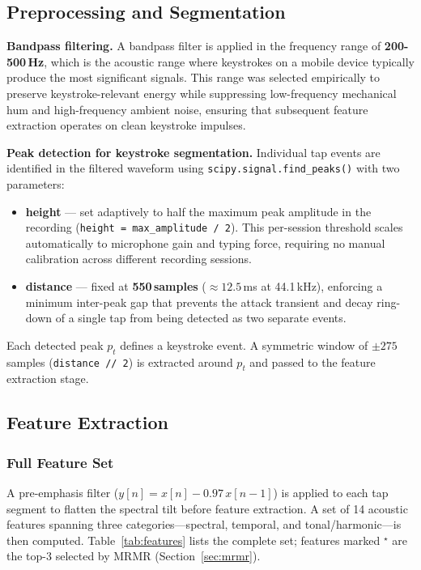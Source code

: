 \documentclass[conference]{IEEEtran}
\begin{document}
\subsection{Preprocessing and Segmentation}

\textbf{Bandpass filtering.}
A bandpass filter is applied in the frequency range of
\textbf{200-500\,Hz}, which is the acoustic range where
keystrokes on a mobile device typically produce the most
significant signals.
This range was selected empirically to preserve keystroke-relevant
energy while suppressing low-frequency mechanical hum and
high-frequency ambient noise, ensuring that subsequent feature
extraction operates on clean keystroke impulses.

\textbf{Peak detection for keystroke segmentation.}
Individual tap events are identified in the filtered waveform using
\texttt{scipy.signal.find\_peaks()} with two parameters:
\begin{itemize}
  \item \textbf{height} — set adaptively to half the maximum peak
        amplitude in the recording
        (\texttt{height\,=\,max\_amplitude\,/\,2}).
        This per-session threshold scales automatically to
        microphone gain and typing force, requiring no manual
        calibration across different recording sessions.
  \item \textbf{distance} — fixed at \textbf{550\,samples}
        (${\approx}12.5$\,ms at 44.1\,kHz), enforcing a minimum
        inter-peak gap that prevents the attack transient and
        decay ring-down of a single tap from being detected as
        two separate events.
\end{itemize}
Each detected peak $p_t$ defines a keystroke event.
A symmetric window of $\pm 275$\,samples (\texttt{distance\,//\,2})
is extracted around $p_t$ and passed to the feature extraction
stage.

\subsection{Feature Extraction}

\subsubsection{Full Feature Set}

A pre-emphasis filter ($y[n] = x[n] - 0.97\,x[n-1]$) is applied to
each tap segment to flatten the spectral tilt before feature
extraction.
A set of 14 acoustic features spanning three categories---spectral,
temporal, and tonal/harmonic---is then computed.
Table~\ref{tab:features} lists the complete set; features marked
$^\star$ are the top-3 selected by MRMR (Section~\ref{sec:mrmr}).
\end{document}
